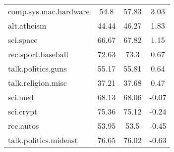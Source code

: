 \begin{table}[htbp]
\begin{tabular}{l|c|c|c|}
comp.sys.mac.hardware      & 54.8                                                             & 57.83                                                        & 3.03                                                              \\
alt.atheism                & 44.44                                                            & 46.27                                                        & 1.83                                                              \\
sci.space                  & 66.67                                                            & 67.82                                                        & 1.15                                                              \\
rec.sport.baseball         & 72.63                                                            & 73.3                                                         & 0.67                                                              \\
talk.politics.guns         & 55.17                                                            & 55.81                                                        & 0.64                                                              \\
talk.religion.misc         & 37.21                                                            & 37.68                                                        & 0.47                                                              \\
sci.med                    & 68.13                                                            & 68.06                                                        & -0.07                                                             \\
sci.crypt                  & 75.36                                                            & 75.12                                                        & -0.24                                                             \\
rec.autos                  & 53.95                                                            & 53.5                                                         & -0.45                                                             \\
talk.politics.mideast      & 76.65                                                            & 76.02                                                        & -0.63                                                             \\

\end{tabular}
\end{table}
